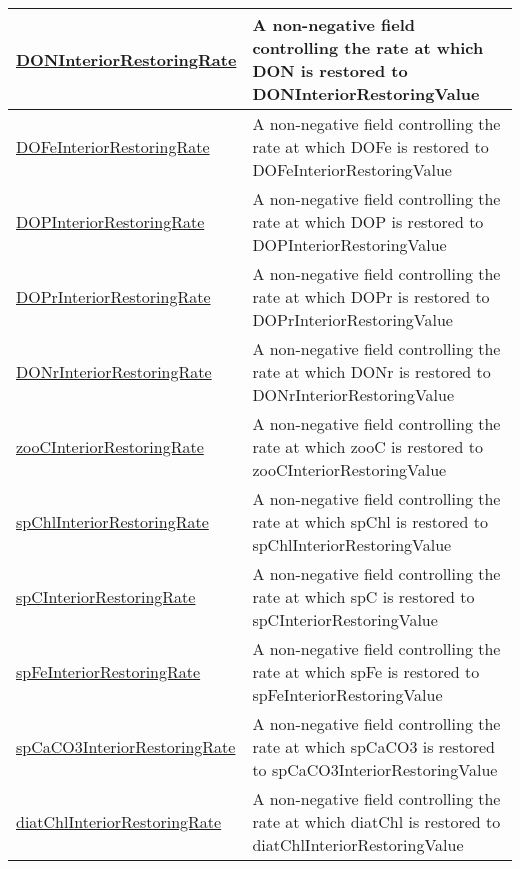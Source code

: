 {\begin{center}
\begin{longtable}{| p{2.0in} | p{4.0in} |}
    \hline
    \hyperref[subsec:var_sec_forcing_DONInteriorRestoringRate]{DONInteriorRestoringRate} & A non-negative field controlling the rate at which DON is restored to DONInteriorRestoringValue \\
    \hline
    \hyperref[subsec:var_sec_forcing_DOFeInteriorRestoringRate]{DOFeInteriorRestoringRate} & A non-negative field controlling the rate at which DOFe is restored to DOFeInteriorRestoringValue \\
    \hline
    \hyperref[subsec:var_sec_forcing_DOPInteriorRestoringRate]{DOPInteriorRestoringRate} & A non-negative field controlling the rate at which DOP is restored to DOPInteriorRestoringValue \\
    \hline
    \hyperref[subsec:var_sec_forcing_DOPrInteriorRestoringRate]{DOPrInteriorRestoringRate} & A non-negative field controlling the rate at which DOPr is restored to DOPrInteriorRestoringValue \\
    \hline
    \hyperref[subsec:var_sec_forcing_DONrInteriorRestoringRate]{DONrInteriorRestoringRate} & A non-negative field controlling the rate at which DONr is restored to DONrInteriorRestoringValue \\
    \hline
    \hyperref[subsec:var_sec_forcing_zooCInteriorRestoringRate]{zooCInteriorRestoringRate} & A non-negative field controlling the rate at which zooC is restored to zooCInteriorRestoringValue \\
    \hline
    \hyperref[subsec:var_sec_forcing_spChlInteriorRestoringRate]{spChlInteriorRestoringRate} & A non-negative field controlling the rate at which spChl is restored to spChlInteriorRestoringValue \\
    \hline
    \hyperref[subsec:var_sec_forcing_spCInteriorRestoringRate]{spCInteriorRestoringRate} & A non-negative field controlling the rate at which spC is restored to spCInteriorRestoringValue \\
    \hline
    \hyperref[subsec:var_sec_forcing_spFeInteriorRestoringRate]{spFeInteriorRestoringRate} & A non-negative field controlling the rate at which spFe is restored to spFeInteriorRestoringValue \\
    \hline
    \hyperref[subsec:var_sec_forcing_spCaCO3InteriorRestoringRate]{spCaCO3InteriorRestoringRate} & A non-negative field controlling the rate at which spCaCO3 is restored to spCaCO3InteriorRestoringValue \\
    \hline
    \hyperref[subsec:var_sec_forcing_diatChlInteriorRestoringRate]{diatChlInteriorRestoringRate} & A non-negative field controlling the rate at which diatChl is restored to diatChlInteriorRestoringValue \\

\end{longtable}
\end{center}}
